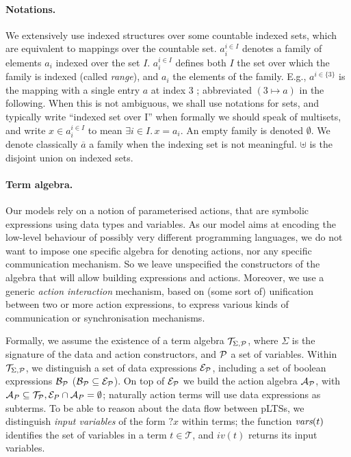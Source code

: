 \documentclass{lncs/llncs}
\def\AlgT{\mathcal{T}}
\begin{document}
\paragraph*{Notations.}
We extensively use indexed structures
over some countable indexed sets, which are equivalent to mappings over
the countable set. %
$a_i^{i\in I}$
denotes a family of elements $a_i$ indexed over the
set $I$. %
$a_i^{i\in I}$ defines both $I$ the set over which the family is
indexed (called \emph{range}), and $a_i$ the elements of the family.
E.g., $a^{i\in\{3\}}$ is the mapping with a single entry $a$ at index
$3$ ; abbreviated $(3\mapsto a)$ in the following.
When this is not
ambiguous, we shall use notations for sets, and typically write
``indexed set over I'' when formally we should speak of multisets, and
write $x\in a_i^{i\in I}$ to mean $\exists i\in I.\, x=a_i$.  An empty
family is denoted $\emptyset$. We
denote classically $\overline{a}$ a family when the indexing set is
not meaningful.  $\uplus$ is the disjoint union on
indexed sets.


\paragraph*{Term algebra.}
Our models rely on a notion of parameterised actions, that are
symbolic expressions using data types and variables. As our model aims
at encoding the low-level behaviour of possibly very different
programming languages, we do not want to impose one specific algebra
for denoting actions, nor any specific communication mechanism. So we
leave unspecified the constructors of the algebra that will allow building
expressions and actions. Moreover, we use a generic {\em action interaction}
mechanism, based on (some sort of) unification between two or more action
expressions, to express various kinds of communication or
synchronisation mechanisms.

\def\Talg{\mathcal{T}_{\Sigma,\P}}
Formally, we assume the existence of a term algebra $\Talg$,
where $\Sigma$ is the signature of the data and action constructors,
and $\P$ a set of variables. Within $\Talg$, we distinguish a set of
data expressions $\mathcal{E}_\P$, including a set of boolean
expressions $\mathcal{B}_{\P}$ ($\mathcal{B}_{\P}\subseteq\mathcal{E}_\P$).
On top of $\mathcal{E}_\P$ we build the action algebra
$\mathcal{A}_\P$, with $\mathcal{A}_P\subseteq\mathcal{T}_\P,
\mathcal{E}_P\cap\mathcal{A}_P=\emptyset$;
naturally action terms will use data expressions as subterms.
To be able to reason about the data flow between pLTSs, we
distinguish \emph{input variables} of the form $?x$ within terms; the function
$\vars(t)$ identifies the set of variables in a term
$t\in\AlgT$, and $iv(t)$ returns its input variables.
\end{document}
